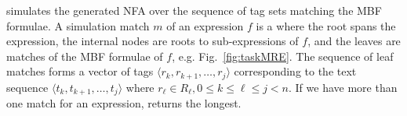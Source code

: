 \framework simulates the generated NFA over the sequence of tag sets matching the MBF formulae.
A simulation match $m$ of an expression $f$ is a  where the root spans the expression, the internal nodes are roots to sub-expressions of $f$, and the leaves are matches of the MBF formulae of $f$, e.g. Fig.~\ref{fig:taskMRE}.
The sequence of leaf matches forms a vector of tags $\langle r_k,r_{k+1},\dots,r_j\rangle$ 
corresponding to the text sequence 
$\langle t_k,t_{k+1},\dots,t_j\rangle$ where $r_{\ell}\in R_{\ell},0\le k\le \ell \le j < n$.
%
%
If we have more than one match for an expression, 
\framework returns the longest.


